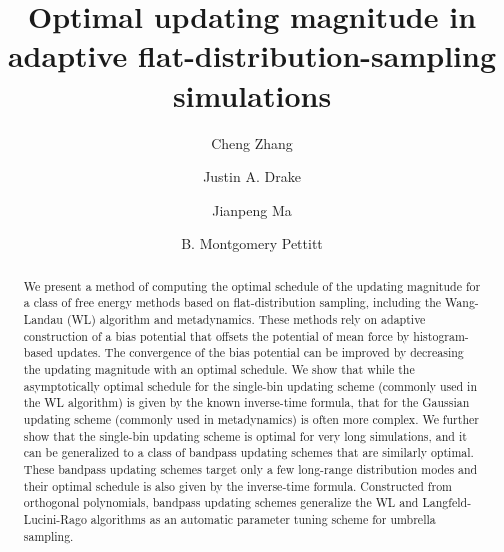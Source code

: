 \documentclass[preprint, superscriptaddress, floatfix]{revtex4-1}
\begin{document}
\title{Optimal updating magnitude in adaptive flat-distribution-sampling simulations}

\author{Cheng Zhang}
\author{Justin A. Drake}
\author{Jianpeng Ma}
\author{B. Montgomery Pettitt}



\begin{abstract}
  We present a method of computing the optimal schedule
  of the updating magnitude
  for a class of free energy methods based on flat-distribution sampling,
  including the Wang-Landau (WL) algorithm and metadynamics.
  These methods rely on adaptive construction of
  a bias potential that offsets
  the potential of mean force by histogram-based updates.
  The convergence of the bias potential can be improved
  by decreasing the updating magnitude with an optimal schedule.
  We show that while the asymptotically optimal schedule for
  the single-bin updating scheme (commonly used in the WL algorithm)
  is given by the known inverse-time formula,
  that for the Gaussian updating scheme (commonly used in metadynamics)
  is often more complex.
  We further show that the single-bin updating scheme
  is optimal for very long simulations,
  and it can be generalized to a class of bandpass updating schemes
  that are similarly optimal.
  These bandpass updating schemes target only
  a few long-range distribution modes
  and their optimal schedule
  is also given by the inverse-time formula.
  Constructed from orthogonal polynomials,
  bandpass updating schemes generalize
  the WL and Langfeld-Lucini-Rago algorithms
  as an automatic parameter tuning scheme for umbrella sampling.
\end{abstract}

\maketitle
\end{document}
